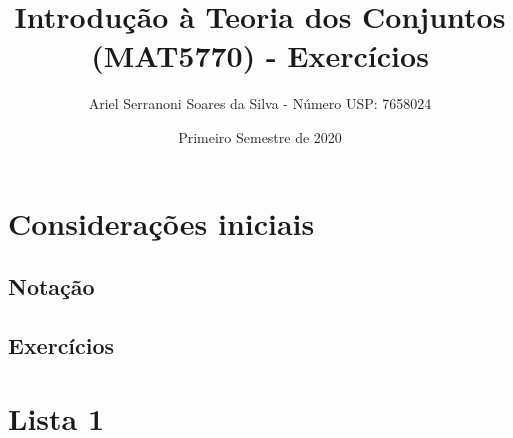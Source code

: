\documentclass[a4paper]{article}
\title{Introdução à Teoria dos Conjuntos (MAT5770) - Exercícios}
\author{Ariel Serranoni Soares da Silva  - Número USP: 7658024}
\date{Primeiro Semestre de 2020}
\begin{document}
\maketitle
\section*{Considerações iniciais}
\subsection*{Notação}
\subsection*{Exercícios}
\section{Lista 1}
\end{document}

